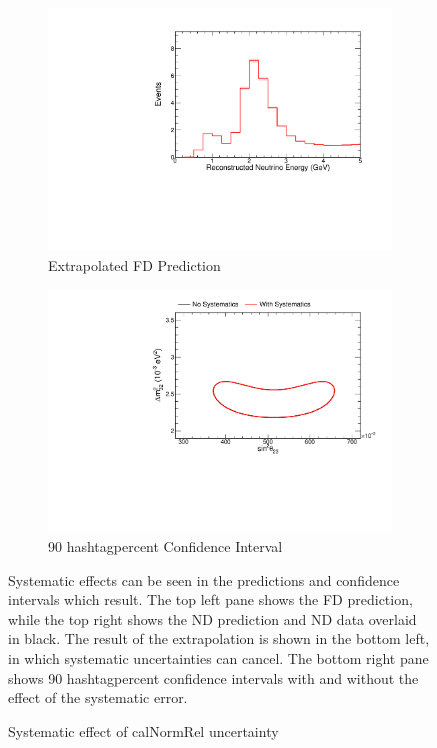 {\begin{figure}
\begin{center}
\begin{subfigure}[c]{0.49\textwidth}
\includegraphics[width=\textwidth]{figures/systs/prediction/fd_extrap_prediction_calNormRel.pdf}
\caption*{Extrapolated FD Prediction}
\end{subfigure}
\begin{subfigure}[c]{0.49\textwidth}
\includegraphics[width=\textwidth]{figures/systs/prediction/fd_extrap_contour_calNormRel.pdf}
\caption*{90 hashtagpercent Confidence Interval}
\end{subfigure}
\end{center}
\caption{Systematic effect of calNormRel uncertainty}{
Systematic effects can be seen in the predictions and confidence intervals
which result.
The top left pane shows the FD prediction, while the top right shows the
ND prediction and ND data overlaid in black.
The result of the extrapolation is shown in the bottom left, in which
systematic uncertainties can cancel.
The bottom right pane shows 90 hashtagpercent confidence intervals with and without
the effect of the systematic error.}
\label{syst_fig_calNormRel}


\end{figure}}
